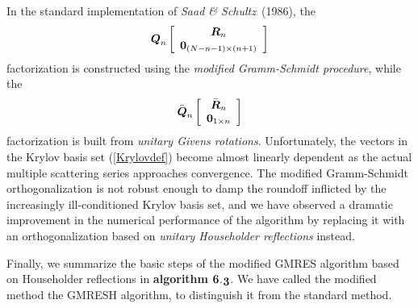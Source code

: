 






In the standard implementation of {\em Saad \& Schultz\/}~(1986), 
the 
\[
{\mbox{\boldmath$\mit Q$\unboldmath}}_{n}\left[ \begin{array}{c} {\mbox{\boldmath$\mit R$\unboldmath}}_{n} \\ {\bf 0}_{(N-n-1) 
\times 
(n+1)}\end{array}  \right]
\]
 factorization is constructed using the {\em 
modified Gramm-Schmidt procedure\/}, while the 
\[
\bar{\mbox{\boldmath$\mit Q$\unboldmath}}_{n}\left[ \begin{array}{c} \bar{\mbox{\boldmath$\mit R$\unboldmath}}_{n} \\ {\bf 0}_{1 
\times 
n}\end{array}  \right]
\]
 factorization
 is built from {\em unitary Givens rotations\/}.
 Unfortunately, the vectors in the  Krylov basis set (\ref{Krylovdef}) 
 become almost linearly dependent as the actual multiple scattering series 
 approaches convergence. The modified Gramm-Schmidt orthogonalization is 
 not robust enough to damp the roundoff inflicted by the increasingly 
 ill-conditioned Krylov basis set, and we have observed a dramatic 
improvement 
 in the numerical performance of the algorithm by replacing it with
 an orthogonalization based on {\em unitary Householder reflections\/} 
 instead. 





 
 Finally, we summarize the basic steps of the modified GMRES algorithm
 based on Householder reflections  in 
{\bf  algorithm }${\mbox{\boldmath$\mit 6$\unboldmath}}$.${\mbox{\boldmath$\mit 3$\unboldmath}}$. We have called the modified method
the GMRESH  algorithm, to distinguish it from the standard method.   







